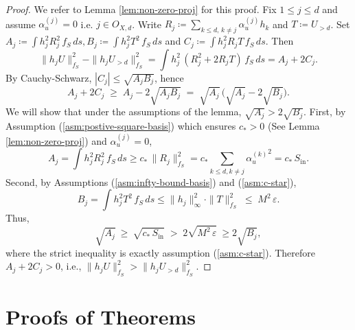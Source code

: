 \documentclass[
  12pt]{article}
\begin{document}
\begin{proof}
We refer to Lemma \ref{lem:non-zero-proj} for this proof. Fix $1 \leq j\leq d$ and assume $\alpha_u^{(j)}=0$ i.e. $j \in O_{X,d}$. Write $R_j\coloneqq\sum_{k\leq d,\,k\neq j}\alpha_u^{(j)} h_k$ and $T\coloneqq U_{>d}$.
Set
$
A_j\coloneqq\int h_j^2 R_j^2\,f_S\,ds,
B_j\coloneqq\int h_j^2 T^2\,f_S\,ds$ and $
C_j\coloneqq\int h_j^2 R_j T\,f_S\,ds.
$
Then
$$
\|h_jU\|_{f_S}^2-\|h_jU_{>d}\|_{f_S}^2
=\int h_j^2\,(R_j^2+2R_jT)\,f_S\,ds
=A_j+2C_j.
$$
By Cauchy-Schwarz, $|C_j|\le\sqrt{A_j B_j}$, hence
$$
A_j+2C_j \;\ge\; A_j - 2\sqrt{A_jB_j}
\;=\; \sqrt{A_j}\,\big(\sqrt{A_j}-2\sqrt{B_j}\big).
$$
We will show that under the assumptions of the lemma, $\sqrt{A_j}>2\sqrt{B_j}$. First, by Assumption (\ref{asm:postive-square-basis}) which ensures $c_\ast >0$ (See Lemma \ref{lem:non-zero-proj}) and $\alpha_u^{(j)}=0$,
$$
A_j = \int h_j^2 R_j^2\,f_S\,ds
\geq c_\ast\,\|R_j\|_{f_S}^2
= c_\ast\sum_{k\le d,k\neq j}{\alpha_u^{(k)}}^2
= c_*\,S_{\mathrm{in}}.
$$
Second, by Assumptions (\ref{asm:infty-bound-basis}) and (\ref{asm:c-star}),
$$
B_j = \int h_j^2 T^2\,f_S\,ds
\leq \|h_j\|_\infty^2\cdot\|T\|_{f_S}^2
\;\le\; M^2\,\varepsilon.
$$
Thus,
$$
\sqrt{A_j}\ \ge\ \sqrt{c_*\,S_{\mathrm{in}}}
\;>\; 2\sqrt{M^2\,\varepsilon}\ \geq 2\sqrt{B_j},
$$
where the strict inequality is exactly assumption (\ref{asm:c-star}).
Therefore $A_j+2C_j>0$, i.e.,
$\|h_jU\|_{f_S}^2>\|h_jU_{>d}\|_{f_S}^2$.
\end{proof}
\section{Proofs of Theorems}
\end{document}
